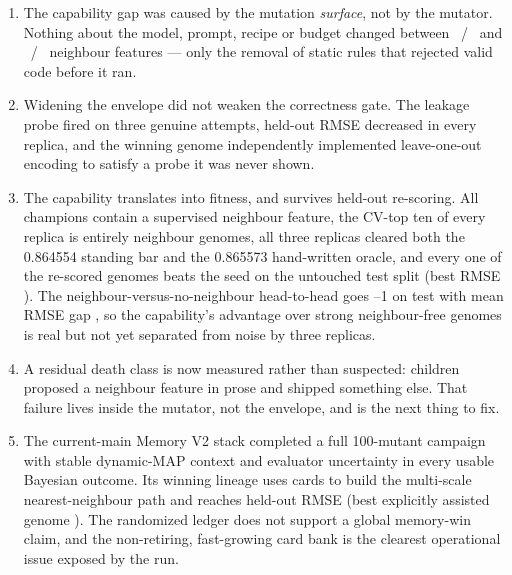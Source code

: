\documentclass[11pt]{article}
\begin{document}
\begin{enumerate}
\item The capability gap was caused by the mutation \emph{surface}, not by the mutator.
Nothing about the model, prompt, recipe or budget changed between
\priorNbrBuilt{}~/~\priorPrograms{} and \allNbrBuilt{}~/~\allPrograms{} neighbour features ---
only the removal of static rules that rejected valid code before it ran.
\item Widening the envelope did not weaken the correctness gate. The leakage probe fired on
three genuine attempts, held-out RMSE decreased in every replica, and the winning genome
independently implemented leave-one-out encoding to satisfy a probe it was never shown.
\item The capability translates into fitness, and survives held-out re-scoring. All
\allChampReplicas{} champions contain a supervised neighbour feature, the CV-top ten of every
replica is entirely neighbour genomes, all three replicas cleared both the 0.864554 standing
bar and the 0.865573 hand-written oracle, and every one of the \allPanelScored{} re-scored
genomes beats the seed on the untouched test split (best RMSE \allPanelBestRmse{}). The
neighbour-versus-no-neighbour head-to-head goes \allNbrGapRmseWins{}--1 on test with mean
RMSE gap \allNbrGapRmseMean{}, so the capability's advantage over strong neighbour-free genomes is
real but not yet separated from noise by three replicas.
\item A residual death class is now measured rather than suspected:
\allNbrMentionOnly{} children proposed a neighbour feature in prose and shipped something
else. That failure lives inside the mutator, not the envelope, and is the next thing to fix.
\item The current-main Memory V2 stack completed a full 100-mutant campaign with stable
dynamic-MAP context and evaluator uncertainty in every usable Bayesian outcome. Its winning
lineage uses cards to build the multi-scale nearest-neighbour path and reaches
\memBestTestRmse{} held-out RMSE (best explicitly assisted genome
\memExplicitBestRmse{}).
The randomized ledger does not support a global memory-win claim, and the non-retiring,
fast-growing card bank is the clearest operational issue exposed by the run.
\end{enumerate}
\end{document}
